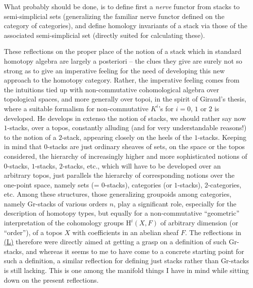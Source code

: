 What probably should be done, is to define first a
\emph{nerve} functor from stacks to semi-simplicial sets (generalizing
the familiar nerve functor defined on the category of categories), and
define homology invariants of a stack via those of the associated
semi-simplicial set (directly suited for calculating these).

\label{sec:16}%
These reflections on the proper place of the notion of a stack which in
standard homotopy algebra are largely a posteriori -- the clues they
give are surely not so strong as to give an imperative feeling for the
need of developing this new approach to the homotopy category. Rather,
the imperative feeling comes from the intuitions tied up with
non-commutative cohomological algebra over topological spaces, and
more generally over topoi, in the spirit of Giraud's thesis, where a
suitable formalism for non-commutative $K^i$'s for $i=0$, $1$ or $2$
is developed. He develops in extenso the notion of stacks, we should
rather say now $1$-stacks, over a topos, constantly alluding (and for
very understandable reasons!) to the notion of a $2$-stack, appearing
closely on the heels of the $1$-stacks. Keeping in mind that
$0$-stacks are just ordinary sheaves of sets, on the space or the
topos considered, the hierarchy of increasingly higher and more sophisticated notions of
$0$-stacks, $1$-stacks, $2$-stacks, etc., which will have to be
developed over an arbitrary topos, just parallels the hierarchy of
corresponding notions over the one-point space, namely
sets (= $0$-stacks), categories (or $1$-stacks), $2$-categories, etc.
Among these structures, those generalizing groupoids among categories,
namely Gr-stacks of various orders $n$, play a significant role,
especially for the description of homotopy types, but equally for a
non-commutative ``geometric'' interpretation of the cohomology groups
$\mathrm H^i(X,F)$ of arbitrary dimension (or ``order''), of a topos $X$ with
coefficients in an abelian sheaf $F$. The reflections in \hyperref[ch:I]{(L)} therefore
were directly aimed at getting a grasp on a definition of such
Gr-stacks, and whereas it seems to me to have come to a concrete
starting point for such a definition, a similar reflection for
defining just stacks rather than Gr-stacks is still lacking. This is
one among the manifold things I have in mind while sitting down on the
present reflections.

